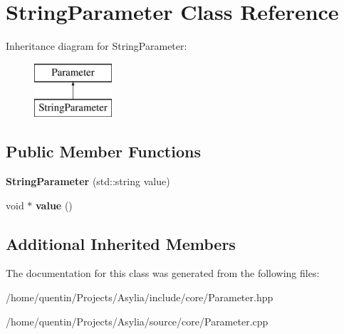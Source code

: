\hypertarget{classStringParameter}{\section{String\-Parameter Class Reference}
\label{classStringParameter}
}
Inheritance diagram for String\-Parameter\-:\begin{figure}[H]
\begin{center}
\leavevmode
\includegraphics[height=2.000000cm]{classStringParameter}
\end{center}
\end{figure}
\subsection*{Public Member Functions}
\begin{DoxyCompactItemize}
\item 
\hypertarget{classStringParameter_ae33eb047a4bc670d668ec6d42194b107}{{\bfseries String\-Parameter} (std\-::string value)}\label{classStringParameter_ae33eb047a4bc670d668ec6d42194b107}

\item 
\hypertarget{classStringParameter_a0bd5b632da96a3c655fd24e40996b8a8}{void $\ast$ {\bfseries value} ()}\label{classStringParameter_a0bd5b632da96a3c655fd24e40996b8a8}

\end{DoxyCompactItemize}
\subsection*{Additional Inherited Members}


The documentation for this class was generated from the following files\-:\begin{DoxyCompactItemize}
\item 
/home/quentin/\-Projects/\-Asylia/include/core/Parameter.\-hpp\item 
/home/quentin/\-Projects/\-Asylia/source/core/Parameter.\-cpp\end{DoxyCompactItemize}

